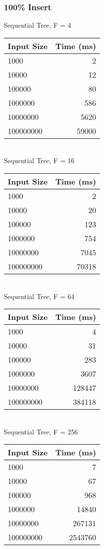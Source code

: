 \documentclass{sig-alternate}
\begin{document}
\subsubsection{100\% Insert}
Sequential Tree, F = 4\\
\begin{tabular}{| l | r |}
  \hline
  Input Size & Time (ms)\\  \hline
  1000			&	2	\\
  10000			&	12	\\
  100000		&	80	\\
  1000000		&	586	\\
  10000000		&	5620	\\
  100000000		&	59000	\\
  \hline
\end{tabular} \\

Sequential Tree, F = 16\\
\begin{tabular}{| l | r |}
  \hline
  Input Size & Time (ms)\\  \hline
  1000			&	2	\\
  10000			&	20	\\
  100000		&	123	\\
  1000000		&	754	\\
  10000000		&	7045	\\
  100000000		&	70318	\\
  \hline
\end{tabular} \\

Sequential Tree, F = 64\\
\begin{tabular}{| l | r |}
  \hline
  Input Size & Time (ms)\\  \hline
  1000			&	4	\\
  10000			&	31	\\
  100000		&	283	\\
  1000000		&	3607	\\
  10000000		&	128447	\\
  100000000		&	384118\\
  \hline
\end{tabular} \\

Sequential Tree, F = 256\\
\begin{tabular}{| l | r |}
  \hline
  Input Size & Time (ms)\\  \hline
  1000			&	7	\\
  10000			&	67	\\
  100000		&	968	\\
  1000000		&	14840	\\
  10000000		&	267131	\\
  100000000		&	2543760	\\
  \hline
\end{tabular}\\
\end{document}

